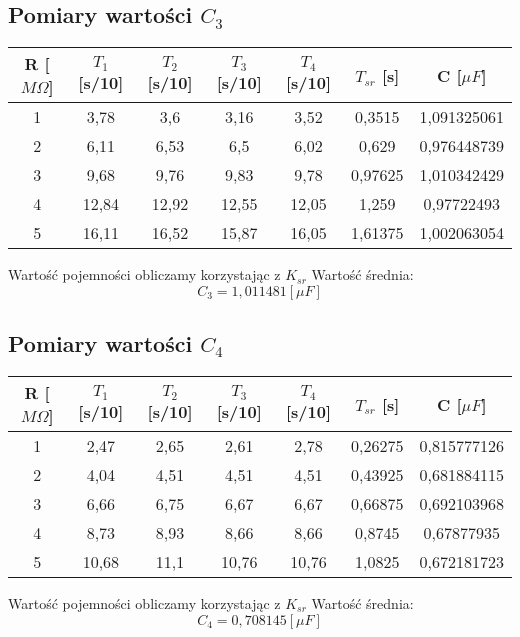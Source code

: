 \documentclass[polish,a4paper]{article}
\begin{document}
\subsection{Pomiary wartości $C_3$}

\begin{table}[H]
\centering
\begin{tabular}{|c|c|c|c|c|c|c|}
\hline
R [$M\Omega$] & $T_1$ [s/10] & $T_2$ [s/10] & $T_3$ [s/10] & $T_4$ [s/10] & $T_{sr}$ [s] & C [$\mu F$] \\
\hline
1&	3,78&	3,6&	3,16&	3,52&	0,3515&	1,091325061 \\
2&	6,11&	6,53&	6,5&	6,02&	0,629&	0,976448739 \\
3&	9,68&	9,76&	9,83&	9,78&	0,97625&	1,010342429 \\
4&	12,84&	12,92&	12,55&	12,05&	1,259&	0,97722493 \\
5&	16,11&	16,52&	15,87&	16,05&	1,61375&	1,002063054 \\

\hline
\end{tabular}
\end{table}
Wartość pojemności obliczamy korzystając z $K_{sr}$
Wartość średnia:
$$C_3 = 1,011481[\mu F]$$

\subsection{Pomiary wartości $C_4$}

\begin{table}[H]
\centering
\begin{tabular}{|c|c|c|c|c|c|c|}
\hline
R [$M\Omega$] & $T_1$ [s/10] & $T_2$ [s/10] & $T_3$ [s/10] & $T_4$ [s/10] & $T_{sr}$ [s] & C [$\mu F$] \\
\hline
1&	2,47&	2,65&	2,61&	2,78&	0,26275	&0,815777126 \\
2&	4,04&	4,51&	4,51&	4,51&	0,43925	&0,681884115 \\
3&	6,66&	6,75&	6,67&	6,67&	0,66875&	0,692103968 \\
4&	8,73&	8,93&	8,66&	8,66&	0,8745&	0,67877935 \\
5&	10,68&	11,1&	10,76&	10,76&	1,0825&	0,672181723 \\

\hline
\end{tabular}
\end{table}
Wartość pojemności obliczamy korzystając z $K_{sr}$
Wartość średnia:
$$C_4 = 0,708145[\mu F]$$
\end{document}
